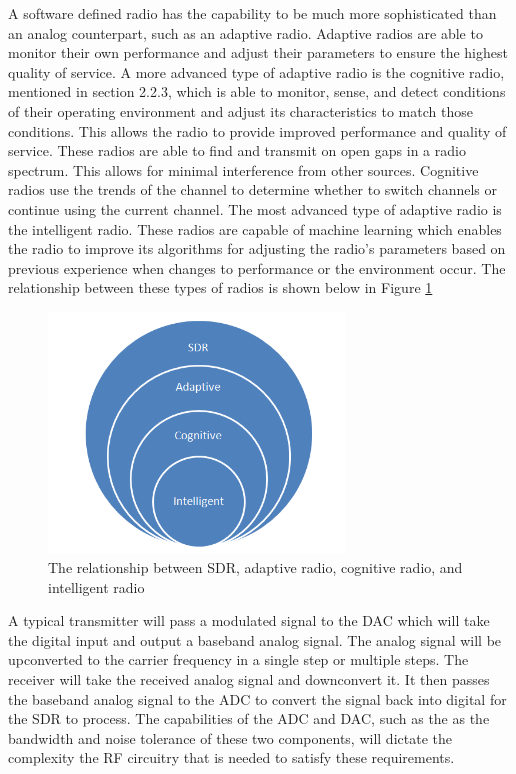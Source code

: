 A software defined radio has the capability to be much more sophisticated than an analog counterpart, such as an adaptive radio. Adaptive radios are able to monitor their own performance and adjust their parameters to ensure the highest quality of service. A more advanced type of adaptive radio is the cognitive radio, mentioned in section 2.2.3, which is able to monitor, sense, and detect conditions of their operating environment and adjust its characteristics to match those conditions. This allows the radio to provide improved performance and quality of service. These radios are able to find and transmit on open gaps in a radio spectrum. This allows for minimal interference from other sources. Cognitive radios use the trends of the channel to determine whether to switch channels or continue using the current channel. The most advanced type of adaptive radio is the intelligent radio. These radios are capable of machine learning which enables the radio to improve its algorithms for adjusting the radio's parameters based on previous experience when changes to performance or the environment occur. The relationship between these types of radios is shown below in Figure \ref{fig:sdr_relationship_diagram}
\begin{figure}[ht]
\centering
\includegraphics[width=0.70\textwidth]{img/sdr_diagram2.png}
\caption{The relationship between SDR, adaptive radio, cognitive radio, and intelligent radio}
\label{fig:sdr_relationship_diagram}
\end{figure}\par
A typical transmitter will pass a modulated signal to the DAC which will take the digital input and output a baseband analog signal. The analog signal will be upconverted to the carrier frequency in a single step or multiple steps. The receiver will take the received analog signal and downconvert it. It then passes the baseband analog signal to the ADC to convert the signal back into digital for the SDR to process. The capabilities of the ADC and DAC, such as the as the bandwidth and noise tolerance of these two components, will dictate the complexity the RF circuitry that is needed to satisfy these requirements.\par
